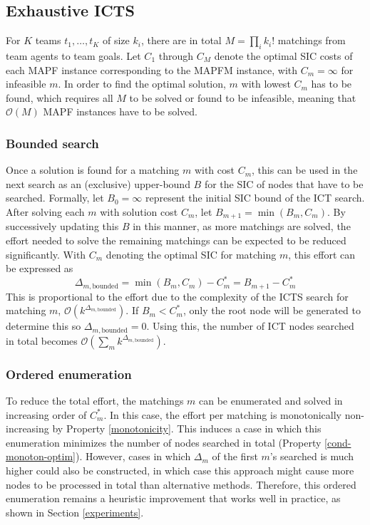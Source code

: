 \documentclass[english]{article}
\begin{document}
	\subsection{Exhaustive ICTS}
	\label{exhaustive}
	For $K$ teams $t_1,\ldots,t_K$ of size $k_i$, there are in total $M = \prod_{i} k_i!$ matchings from team agents to team goals. Let $C_1$ through $C_M$ denote the optimal SIC costs of each MAPF instance corresponding to the MAPFM instance, with $C_m = \infty$ for infeasible $m$. In order to find the optimal solution, $m$ with lowest $C_m$ has to be found, which requires all $M$ to be solved or found to be infeasible, meaning that $\mathcal{O}(M)$ MAPF instances have to be solved. 
	\subsubsection{Bounded search}
	Once a solution is found for a matching $m$ with cost $C_m$, this can be used in the next search as an (exclusive) upper-bound $B$ for the SIC of nodes that have to be searched. Formally, let $B_0 = \infty$ represent the initial SIC bound of the ICT search. After solving each $m$ with solution cost $C_m$, let $B_{m+1} = \min(B_m,C_m)$. By successively updating this $B$ in this manner, as more matchings are solved, the effort needed to solve the remaining matchings can be expected to be reduced significantly. With $C_m$ denoting the optimal SIC for matching $m$, this effort can be expressed as	
	\[\Delta_{m,\text{bounded}} = \min(B_m,C_m) - C^*_m = B_{m+1} - C^*_m\]
	This is proportional to the effort due to the complexity of the ICTS search for matching $m$, $\mathcal{O}(k^{\Delta_{m,\text{bounded}}})$.
	If $B_m < C^*_m$, only the root node will be generated to determine this so $\Delta_{m,\text{bounded}} = 0$.
	Using this, the number of ICT nodes searched in total becomes $\mathcal{O}(\sum_m k^{\Delta_{m,\text{bounded}}})$.
	\subsubsection{Ordered enumeration}
	\label{ordered-enum}
	To reduce the total effort, the matchings $m$ can be enumerated and solved in increasing order of $C^*_m$. In this case, the effort per matching is monotonically non-increasing by Property \ref{monotonicity}. This induces a case in which this enumeration minimizes the number of nodes searched in total (Property \ref{cond-monoton-optim}). However, cases in which $\Delta_m$ of the first $m$'s searched is much higher could also be constructed, in which case this approach might cause more nodes to be processed in total than alternative methods. Therefore, this ordered enumeration remains a heuristic improvement that works well in practice, as shown in Section \ref{experiments}.
	
\end{document}
